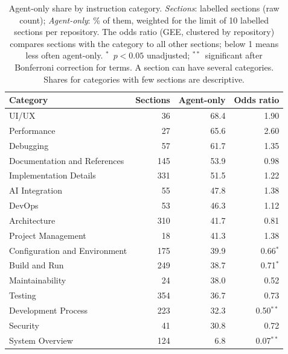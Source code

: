 \begin{table}[t]
\caption{Agent-only share by instruction category. \emph{Sections}: labelled sections (raw count); \emph{Agent-only}: \% of them, weighted for the limit of 10 labelled sections per repository. The odds ratio (GEE, clustered by repository) compares sections with the category to all other sections; below 1 means less often agent-only. $^{*}$~$p < 0.05$ unadjusted; $^{**}$~significant after Bonferroni correction for \geeNTerms{} terms. A section can have several categories. Shares for categories with few sections are descriptive.}
\label{tab:rq1cat}
\footnotesize\setlength{\tabcolsep}{3.5pt}
\begin{tabular}{@{}lrrr@{}}
\toprule
Category & Sections & Agent-only & Odds ratio \\
\midrule
UI/UX & 36 & 68.4 & 1.90 \\
Performance & 27 & 65.6 & 2.60 \\
Debugging & 57 & 61.7 & 1.35 \\
Documentation and References & 145 & 53.9 & 0.98 \\
Implementation Details & 331 & 51.5 & 1.22 \\
AI Integration & 55 & 47.8 & 1.38 \\
DevOps & 53 & 46.3 & 1.12 \\
Architecture & 310 & 41.7 & 0.81 \\
Project Management & 18 & 41.3 & 1.38 \\
Configuration and Environment & 175 & 39.9 & 0.66$^{*}$ \\
Build and Run & 249 & 38.7 & 0.71$^{*}$ \\
Maintainability & 24 & 38.0 & 0.52 \\
Testing & 354 & 36.7 & 0.73 \\
Development Process & 223 & 32.3 & 0.50$^{**}$ \\
Security & 41 & 30.8 & 0.72 \\
System Overview & 124 & 6.8 & 0.07$^{**}$ \\
\bottomrule
\end{tabular}
\end{table}
